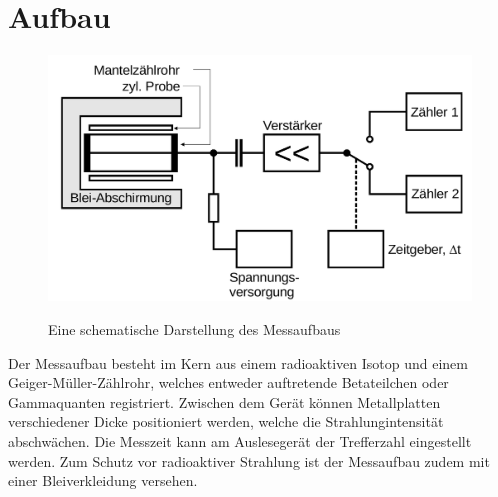 \section{Aufbau}
\label{sec:Aufbau}

\begin{figure}
 \centering
 \caption{Eine schematische Darstellung des Messaufbaus}
 \includegraphics[width=\linewidth-70pt,height=\textheight-70pt,keepaspectratio]{content/aufbau.png}
 \label{fig:aufbau}
\end{figure}

Der Messaufbau besteht im Kern aus einem radioaktiven Isotop und einem Geiger-Müller-Zählrohr, welches entweder auftretende Betateilchen oder Gammaquanten registriert. Zwischen dem Gerät können Metallplatten verschiedener Dicke positioniert werden, welche die Strahlungintensität abschwächen. Die Messzeit kann am Auslesegerät der Trefferzahl eingestellt werden. Zum Schutz vor radioaktiver Strahlung ist der Messaufbau zudem mit einer Bleiverkleidung versehen. 
